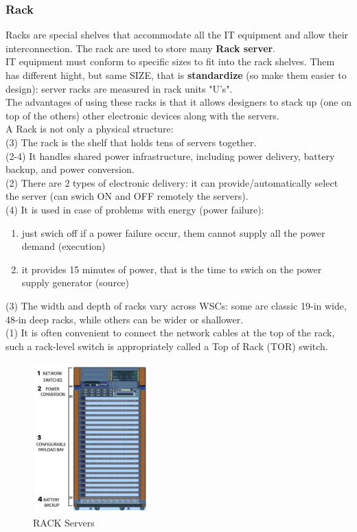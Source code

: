 \documentclass[10pt, oneside]{article}
\begin{document}
\subsubsection{Rack}
Racks are special shelves that accommodate all the IT equipment and allow their interconnection. The rack are used to store many {\bf Rack server}.\\ 
IT equipment must conform to specific sizes to fit into the rack shelves. Them has different hight, but same SIZE, that is {\bf standardize} (so make them easier to design): server racks are measured in rack units "U's".\\ The advantages of using these racks is that it allows designers to stack up (one on top of the others) other electronic devices along with the servers.\\
\newline
A Rack is not only a physical structure:\\
(3) The rack is the shelf that holds tens of servers together. \\(2-4) It handles shared power infrastructure, including power delivery, battery backup, and power conversion.\\
(2) There are 2 types of electronic delivery: it can provide/automatically select the server (can swich ON and OFF remotely the servers).\\
(4) It is used in case of problems with energy (power failure):
\begin{enumerate}
    \item just swich off if a power failure occur, them cannot supply all the power demand (execution)
    \item it provides 15 minutes of power, that is the time to swich on the power supply generator (source) 
\end{enumerate}
(3) The width and depth of racks vary across WSCs: some are classic 19-in wide, 48-in deep racks, while others can be wider or shallower.\\ 
(1) It is often convenient to connect the network cables at the top of the rack, such a rack-level switch is appropriately called a Top of Rack (TOR) switch.\newline\newline
\begin{figure}[H]
    \begin{center}
    \includegraphics[width=0.4\textwidth]{img/img8.jpeg}
    \caption{RACK Servers}
    \label{fig:RACK servers}
    \end{center}
\end{figure}
\end{document}

